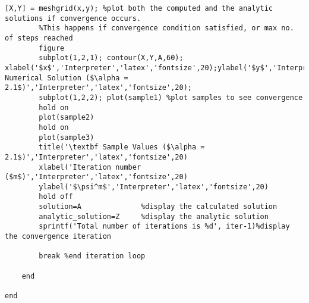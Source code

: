 \documentclass[a4paper,11pt]{article}
\begin{document}
\begin{lstlisting}[style=matlab-editor]
        [X,Y] = meshgrid(x,y); %plot both the computed and the analytic solutions if convergence occurs. 
        %This happens if convergence condition satisfied, or max no. of steps reached
        figure
        subplot(1,2,1); contour(X,Y,A,60); xlabel('$x$','Interpreter','latex','fontsize',20);ylabel('$y$','Interpreter','latex','fontsize',20);title('\textbf Numerical Solution ($\alpha = 2.1$)','Interpreter','latex','fontsize',20);
        subplot(1,2,2); plot(sample1) %plot samples to see convergence
        hold on
        plot(sample2)
        hold on
        plot(sample3)
        title('\textbf Sample Values ($\alpha = 2.1$)','Interpreter','latex','fontsize',20)
        xlabel('Iteration number ($m$)','Interpreter','latex','fontsize',20)
        ylabel('$\psi^m$','Interpreter','latex','fontsize',20)
        hold off
        solution=A              %display the calculated solution 
        analytic_solution=Z     %display the analytic solution
        sprintf('Total number of iterations is %d', iter-1)%display the convergence iteration
        
        break %end iteration loop
        
    end
    
end
\end{lstlisting}
\end{document}
